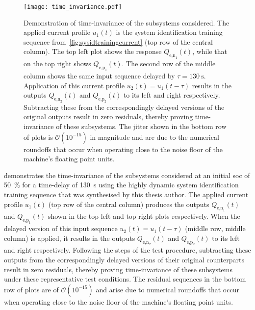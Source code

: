 \begin{figure}[!htb]
    \centering
    \texttt{[image: time\_invariance.pdf]}
    \caption[Demonstration of time-invariance of $Q_\text{e,n}(t)$ and
    $Q_\text{e,p}(t)$ subsystems]{Demonstration of time-invariance of the
        subsystems considered. The applied current profile $u_1(t)$ is the
        system identification training sequence
        from~\cref{fig:sysidtrainingcurrent} (top row of the central column).
        The top left plot shows the response $Q_{\text{e,n}_1}\!(t)$, while that
        on the top right shows $Q_{\text{e,p}_1}\!(t)$. The second row of the
        middle column shows the same input sequence delayed by $\tau =
        \SI{130}{\second}$. Application of this current profile $u_2(t) =
        u_1(t-\tau)$ results in the outputs $Q_{\text{e,n}_2}\!(t)$ and
        $Q_{\text{e,p}_2}\!(t)$ to its left and right respectively. Subtracting
        these from the correspondingly delayed versions of the original outputs
        result in zero residuals, thereby proving time-invariance of these
        subsystems. The jitter shown in the bottom row of plots is
        $\mathcal{O}(10^{-15})$ in magnitude and are due to the numerical
        roundoffs that occur when operating close to the noise floor of the
    machine's floating point units.}%
\label{fig:timeinvariance}
\end{figure}

  demonstrates the  time-invariance  of the  subsystems
considered  at an  initial \gls{soc}  of \SI{50}{\percent}  for a  time-delay of
\SI{130}{\second}  using  the  highly  dynamic  system  identification  training
sequence  that  was synthesised  by  this  thesis  author. The  applied  current
profile  $u_1(t)$  (top  row  of   the  central  column)  produces  the  outputs
$Q_{\text{e,n}_1}\!(t)$ and  $Q_{\text{e,p}_1}\!(t)$ shown  in the top  left and
top right  plots respectively. When the  delayed version of this  input sequence
${u_2(t) = u_1(t-\tau)}$  (middle row, middle column) is applied,  it results in
the outputs $Q_{\text{e,n}_2}\!(t)$ and  $Q_{\text{e,p}_2}\!(t)$ to its left and
right respectively. Following the steps of the test procedure, subtracting these
outputs from the correspondingly delayed versions of their original counterparts
result in  zero residuals, thereby  proving time-invariance of  these subsystems
under these representative test conditions. The residual sequences in the bottom
row of plots are of $\mathcal{O}(10^{-15})$ and arise due to numerical roundoffs
that occur  when operating close  to the noise  floor of the  machine's floating
point units.

